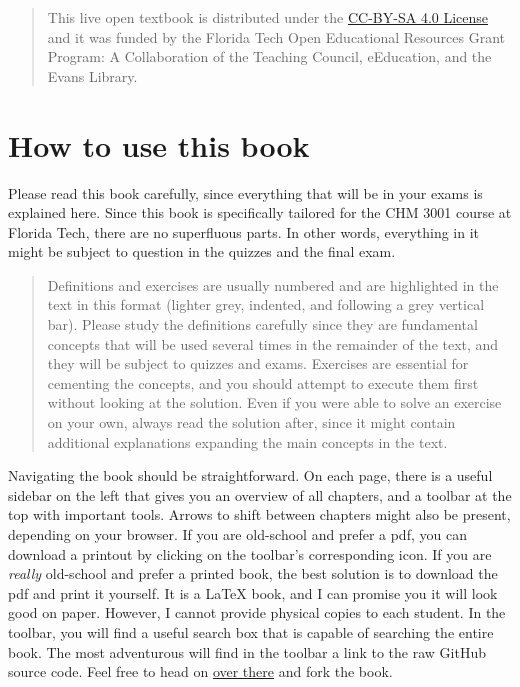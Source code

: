 \documentclass[
  9pt,
]{extbook}
\theoremstyle{definition}
\theoremstyle{definition}
\theoremstyle{definition}
\theoremstyle{remark}
\begin{document}
\begin{quote}
This live open textbook is distributed under the \href{https://creativecommons.org/licenses/by-sa/4.0/}{CC-BY-SA 4.0 License} and it was funded by the Florida Tech Open Educational Resources Grant Program: A Collaboration of the Teaching Council, eEducation, and the Evans Library.
\end{quote}

\hypertarget{how-to-use-this-book}{%
\section*{How to use this book}\label{how-to-use-this-book}}

Please read this book carefully, since everything that will be in your exams is explained here.
Since this book is specifically tailored for the CHM 3001 course at Florida Tech, there are no superfluous parts. In other words, everything in it might be subject to question in the quizzes and the final exam.

\begin{quote}
Definitions and exercises are usually numbered and are highlighted in the text in this format (lighter grey, indented, and following a grey vertical bar). Please study the definitions carefully since they are fundamental concepts that will be used several times in the remainder of the text, and they will be subject to quizzes and exams. Exercises are essential for cementing the concepts, and you should attempt to execute them first without looking at the solution. Even if you were able to solve an exercise on your own, always read the solution after, since it might contain additional explanations expanding the main concepts in the text.
\end{quote}

Navigating the book should be straightforward. On each page, there is a useful sidebar on the left that gives you an overview of all chapters, and a toolbar at the top with important tools. Arrows to shift between chapters might also be present, depending on your browser. If you are old-school and prefer a pdf, you can download a printout by clicking on the toolbar's corresponding icon. If you are \emph{really} old-school and prefer a printed book, the best solution is to download the pdf and print it yourself. It is a LaTeX book, and I can promise you it will look good on paper. However, I cannot provide physical copies to each student. In the toolbar, you will find a useful search box that is capable of searching the entire book. The most adventurous will find in the toolbar a link to the raw GitHub source code. Feel free to head on \href{https://github.com/peverati/PChem1}{over there} and fork the book.
\end{document}
